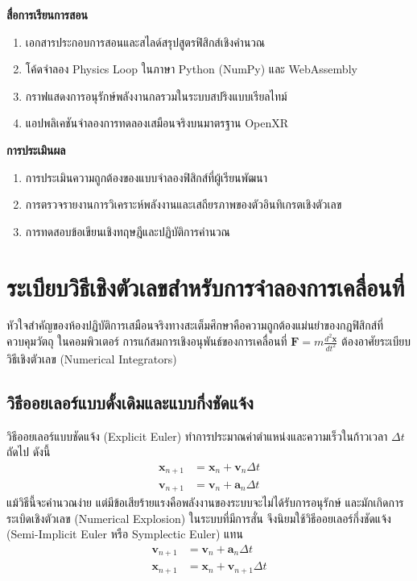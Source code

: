 \noindent\textbf{สื่อการเรียนการสอน}
\begin{enumerate}
    \item เอกสารประกอบการสอนและสไลด์สรุปสูตรฟิสิกส์เชิงคำนวณ
    \item โค้ดจำลอง Physics Loop ในภาษา Python (NumPy) และ WebAssembly
    \item กราฟแสดงการอนุรักษ์พลังงานกลรวมในระบบสปริงแบบเรียลไทม์
    \item แอปพลิเคชันจำลองการทดลองเสมือนจริงบนมาตรฐาน OpenXR
\end{enumerate}

\noindent\textbf{การประเมินผล}
\begin{enumerate}
    \item การประเมินความถูกต้องของแบบจำลองฟิสิกส์ที่ผู้เรียนพัฒนา
    \item การตรวจรายงานการวิเคราะห์พลังงานและเสถียรภาพของตัวอินทิเกรตเชิงตัวเลข
    \item การทดสอบข้อเขียนเชิงทฤษฎีและปฏิบัติการคำนวณ
\end{enumerate}

\newpage

\section{ระเบียบวิธีเชิงตัวเลขสำหรับการจำลองการเคลื่อนที่}

หัวใจสำคัญของห้องปฏิบัติการเสมือนจริงทางสะเต็มศึกษาคือความถูกต้องแม่นยำของกฎฟิสิกส์ที่ควบคุมวัตถุ ในคอมพิวเตอร์ การแก้สมการเชิงอนุพันธ์ของการเคลื่อนที่ $\mathbf{F} = m\frac{d^2\mathbf{x}}{dt^2}$ ต้องอาศัยระเบียบวิธีเชิงตัวเลข (Numerical Integrators)

\subsection{วิธีออยเลอร์แบบดั้งเดิมและแบบกึ่งชัดแจ้ง}

วิธีออยเลอร์แบบชัดแจ้ง (Explicit Euler) ทำการประมาณค่าตำแหน่งและความเร็วในก้าวเวลา $\Delta t$ ถัดไป ดังนี้
\begin{align}
\mathbf{x}_{n+1} &= \mathbf{x}_n + \mathbf{v}_n \Delta t \\
\mathbf{v}_{n+1} &= \mathbf{v}_n + \mathbf{a}_n \Delta t
\end{align}
แม้วิธีนี้จะคำนวณง่าย แต่มีข้อเสียร้ายแรงคือพลังงานของระบบจะไม่ได้รับการอนุรักษ์ และมักเกิดการระเบิดเชิงตัวเลข (Numerical Explosion) ในระบบที่มีการสั่น จึงนิยมใช้วิธีออยเลอร์กึ่งชัดแจ้ง (Semi-Implicit Euler หรือ Symplectic Euler) แทน
\begin{align}
\mathbf{v}_{n+1} &= \mathbf{v}_n + \mathbf{a}_n \Delta t \\
\mathbf{x}_{n+1} &= \mathbf{x}_n + \mathbf{v}_{n+1} \Delta t
\end{align}


